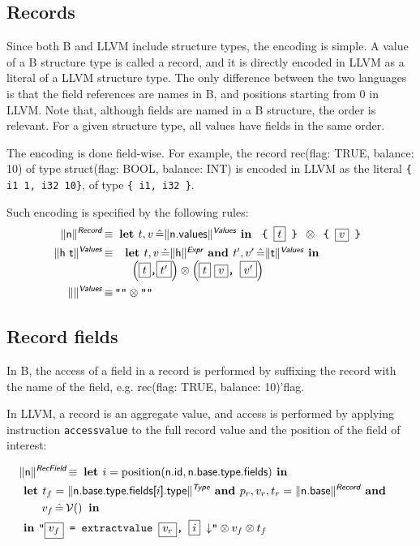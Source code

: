 \documentclass{article}
\newcommand{\trad}[2]{\ensuremath{\lVert \textsf{#1} \rVert^{\textit{#2}}}}
\newcommand{\nl}[0]{\ensuremath{\downarrow}}
\DeclareMathOperator{\isdef}{\equiv}
\DeclareMathOperator{\variable}{\mathcal{V}()}
\newcommand{\llvm}[1]{\texttt{#1}}
\newcommand{\B}[1]{\textsf{#1}}
\newcommand{\LET}[0]{\textbf{ let }}
\DeclareMathOperator{\BE}{\hat{=}}
\newcommand{\IN}[0]{\textbf{ in }}
\newcommand{\AND}[0]{\textbf{ and }}
\newcommand{\PH}[1]{\framebox{$#1$}}
\newcommand{\sep}[0]{\otimes}
\begin{document}
\subsection{Records}

Since both B and LLVM include structure types, the encoding is simple.
A value of a B structure type is called a record, and it is directly
encoded in LLVM as a literal of a LLVM structure type. The only
difference between the two languages is that the field references are
names in B, and positions starting from 0 in LLVM. Note that, although
fields are named in a B structure, the order is relevant. For a given
structure type, all values have fields in the same order.

The encoding is done field-wise. For example, the record \B{rec(flag:
  TRUE, balance: 10)} of type \B{struct(flag: BOOL, balance: INT)} is
encoded in LLVM as the literal \llvm{\{ i1 1, i32 10\}}, of type
\llvm{\{ i1, i32 \}}.

Such encoding is specified by the following rules:
\begin{align*}
\trad{n}{\B{Record}} & \isdef \LET t, v \BE \trad{n.values}{\B{Values}} \IN
\llvm{ \{ } \PH{t} \llvm{ \} } \sep \llvm{ \{ } \PH{ v } \llvm{ \} } \\
\trad{h t}{\B{Values}} & \isdef \begin{array}[t]{l}
  \LET t, v \BE \trad{h}{\B{Expr}} \AND t', v' \BE \trad{t}{\B{Values}} \IN \\
  \quad \left(\PH{t} \llvm{,} \PH{t'}\right) \sep \left(\PH{t}~\PH{v} \llvm{, } \PH{v'}\right) 
\end{array} \\
\trad{}{\B{Values}} & \isdef \llvm{""} \sep \llvm{""}
\end{align*}

\subsection{Record fields}

In B, the access of a field in a record is performed by suffixing the
record with the name of the field, e.g. \B{rec(flag: TRUE, balance:  10)'flag}.

In LLVM, a record is an aggregate value, and access is performed by
applying instruction \llvm{accessvalue} to the full record value and
the position of the field of interest:

\begin{align*}
\lefteqn{\trad{n}{\B{RecField}} \isdef \LET i = \text{position}(\B{n.id}, \B{n.base.type.fields}) \IN} \\
& \LET t_f = \trad{\B{n.base.type.fields[$i$].type}}{\B{Type}} \AND
p_r, v_r, t_r = \trad{\B{n.base}}{\B{Record}} \AND \\
& \quad \quad  v_f \BE \variable \IN \\
& \IN \llvm{"\PH{v_f} = extractvalue \PH{v_r}, \PH{i} \nl"} \sep v_f \sep t_f
\end{align*}
\end{document}
